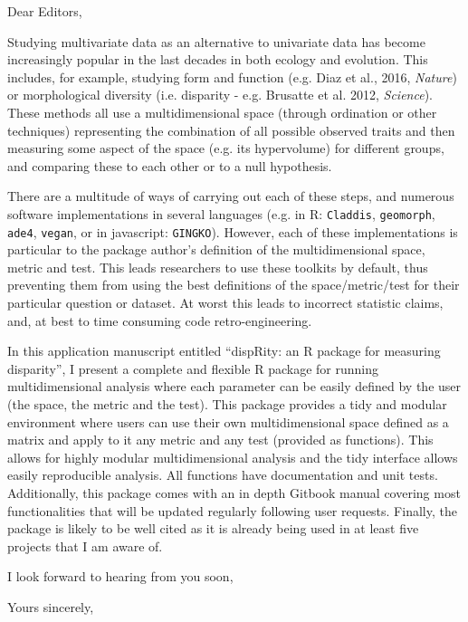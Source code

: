 \documentclass[11pt]{letter}
\begin{document}
\begin{letter}{}
\opening{Dear Editors,}

Studying multivariate data as an alternative to univariate data has become increasingly popular in the last decades in both ecology and evolution.
This includes, for example, studying form and function (e.g. Diaz et al., 2016, \textit{Nature}) or morphological diversity (i.e. disparity - e.g. Brusatte et al. 2012, \textit{Science}).
These methods all use a multidimensional space (through ordination or other techniques) representing the combination of all possible observed traits and then measuring some aspect of the space (e.g. its hypervolume) for different groups, and comparing these to each other or to a null hypothesis.

There are a multitude of ways of carrying out each of these steps, and numerous software implementations in several languages (e.g. in R: \texttt{Claddis}, \texttt{geomorph}, \texttt{ade4}, \texttt{vegan}, or in javascript: \texttt{GINGKO}).
However, each of these implementations is particular to the package author's definition of the multidimensional space, metric and test.
This leads researchers to use these toolkits by default, thus preventing them from using the best definitions of the space/metric/test for their particular question or dataset.
At worst this leads to incorrect statistic claims, and, at best to time consuming code retro-engineering.

In this application manuscript entitled ``dispRity: an R package for measuring disparity'', I present a complete and flexible R package for running multidimensional analysis where each parameter can be easily defined by the user (the space, the metric and the test).
This package provides a tidy and modular environment where users can use their own multidimensional space defined as a matrix and apply to it any metric and any test (provided as functions).
This allows for highly modular multidimensional analysis and the tidy interface allows easily reproducible analysis.
All functions have documentation and unit tests. 
Additionally, this package comes with an in depth Gitbook manual covering most functionalities that will be updated regularly following user requests. 
Finally, the package is likely to be well cited as it is already being used in at least five projects that I am aware of.

I look forward to hearing from you soon,

\closing{Yours sincerely,}

\end{letter}
\end{document}

